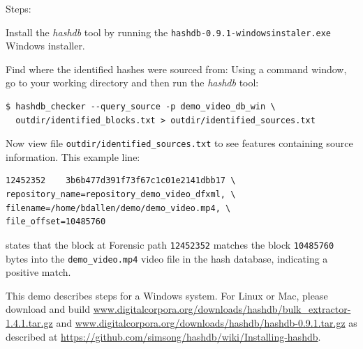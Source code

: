 \documentclass[12pt,twoside]{article}
\newcommand{\hdb}{\emph{hashdb}\xspace}
\begin{document}
Steps:
\begin{compactenum}
\item Install the \hdb tool by running the
\texttt{hashdb-0.9.1-windowsinstaler.exe} Windows installer.
\item Find where the identified hashes were sourced from:
Using a command window, go to your working directory and then run
the \hdb tool:
\begin{verbatim}
$ hashdb_checker --query_source -p demo_video_db_win \
  outdir/identified_blocks.txt > outdir/identified_sources.txt
\end{verbatim}

\item Now view file \texttt{outdir/identified\_sources.txt} to see
features containing source information.
This example line:
\begin{verbatim}
12452352    3b6b477d391f73f67c1c01e2141dbb17 \
repository_name=repository_demo_video_dfxml, \
filename=/home/bdallen/demo/demo_video.mp4, \
file_offset=10485760
\end{verbatim}

states that the block at Forensic path \texttt{12452352}
matches the block \texttt{10485760} bytes into the
\texttt{demo\_video.mp4} video file
in the hash database,
indicating a positive match.
\end{compactenum}

This demo describes steps for a Windows system.
For Linux or Mac, please download and build
\url{www.digitalcorpora.org/downloads/hashdb/bulk\_extractor-1.4.1.tar.gz}
and
\url{www.digitalcorpora.org/downloads/hashdb/hashdb-0.9.1.tar.gz}
as described at
\url{https://github.com/simsong/hashdb/wiki/Installing-hashdb}.
\end{document}
